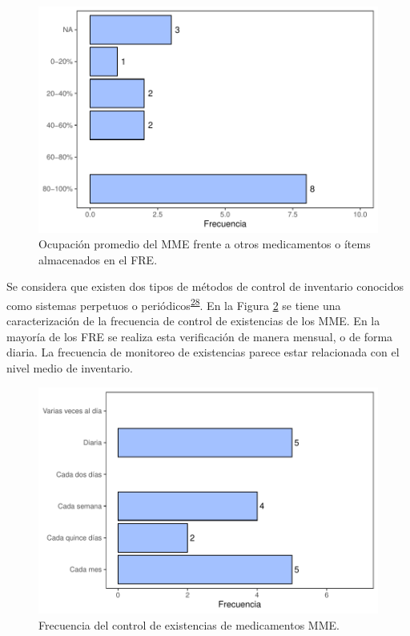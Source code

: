 \documentclass[
]{book}
\begin{document}
\begin{figure}

{\centering \includegraphics[width=0.85\linewidth]{InformeFinal_files/figure-latex/PropOcupacionAlmacen-1} 

}

\caption{Ocupación promedio del MME frente a otros medicamentos o ítems almacenados en el FRE.}\label{fig:PropOcupacionAlmacen}
\end{figure}

Se considera que existen dos tipos de métodos de control de inventario conocidos como sistemas perpetuos o periódicos\textsuperscript{\protect\hyperlink{ref-Silver2017}{28}}.
En la Figura \ref{fig:FrecControlExistencias} se tiene una caracterización de la frecuencia de control de existencias de los MME. En la mayoría de los FRE se realiza esta verificación de manera mensual, o de forma diaria. La frecuencia de monitoreo de existencias parece estar relacionada con el nivel medio de inventario.

\begin{figure}

{\centering \includegraphics[width=1\linewidth]{InformeFinal_files/figure-latex/FrecControlExistencias-1} 

}

\caption{Frecuencia del control de existencias de medicamentos MME.}\label{fig:FrecControlExistencias}
\end{figure}
\end{document}
